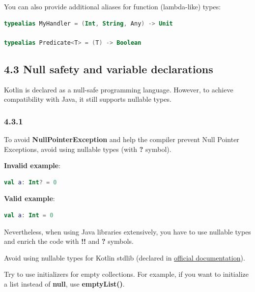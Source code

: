 {{{{{{{{{{{{{{{{{{{{You can also provide additional aliases for function (lambda-like) types:

\begin{lstlisting}[language=Kotlin]
typealias MyHandler = (Int, String, Any) -> Unit

typealias Predicate<T> = (T) -> Boolean
\end{lstlisting}


\subsection*{\textbf{4.3 Null safety and variable declarations}}

\label{sec:4.3}

Kotlin is declared as a null-safe programming language. However, to achieve compatibility with Java, it still supports nullable types.



\subsubsection*{\textbf{4.3.1}}
\leavevmode\newline

\label{sec:4.3.1}

To avoid \textbf{NullPointerException} and help the compiler prevent Null Pointer Exceptions, avoid using nullable types (with \textbf{?} symbol).



\textbf{Invalid example}:

\begin{lstlisting}[language=Kotlin]
val a: Int? = 0
\end{lstlisting}


\textbf{Valid example}:

\begin{lstlisting}[language=Kotlin]
val a: Int = 0
\end{lstlisting}


Nevertheless, when using Java libraries extensively, you have to use nullable types and enrich the code with \textbf{!!} and \textbf{?} symbols.

Avoid using nullable types for Kotlin stdlib (declared in \href{https://kotlinlang.org/api/latest/jvm/stdlib/kotlin.collections/}{official documentation}). 

Try to use initializers for empty collections. For example, if you want to initialize a list instead of \textbf{null}, use \textbf{emptyList()}.



}}}}}}}}}}}}}}}}}}}}
